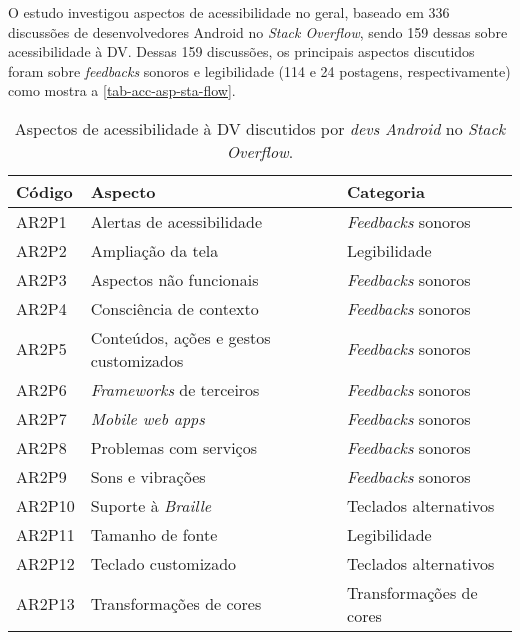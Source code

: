 O estudo investigou aspectos de acessibilidade no geral, baseado em 336 discussões de desenvolvedores Android no \emph{Stack Overflow}, sendo 159 dessas sobre acessibilidade à DV\@.
Dessas 159 discussões, os principais aspectos discutidos foram sobre \emph{feedbacks} sonoros e legibilidade (114 e 24 postagens, respectivamente) como mostra a \autoref{tab-acc-asp-sta-flow}.

\begin{table}[htb]
  \begin{center}
    \ABNTEXfontereduzida
    \caption{Aspectos de acessibilidade à DV discutidos por \emph{devs Android} no \emph{Stack Overflow}.}
    \label{tab-acc-asp-sta-flow}
    \begin{tabular}{p{1.2cm}|p{7.0cm}|p{3.8cm}}
      \textbf{Código} & \textbf{Aspecto}                       & \textbf{Categoria}       \\
      \hline
      AR2P1           & Alertas de acessibilidade              & \emph{Feedbacks} sonoros \\
      \hline
      AR2P2           & Ampliação da tela                      & Legibilidade             \\
      \hline
      AR2P3           & Aspectos não funcionais                & \emph{Feedbacks} sonoros \\
      \hline
      AR2P4           & Consciência de contexto                & \emph{Feedbacks} sonoros \\
      \hline
      AR2P5           & Conteúdos, ações e gestos customizados & \emph{Feedbacks} sonoros \\
      \hline
      AR2P6           & \emph{Frameworks} de terceiros         & \emph{Feedbacks} sonoros \\
      \hline
      AR2P7           & \emph{Mobile web apps}                 & \emph{Feedbacks} sonoros \\
      \hline
      AR2P8           & Problemas com serviços                 & \emph{Feedbacks} sonoros \\
      \hline
      AR2P9           & Sons e vibrações                       & \emph{Feedbacks} sonoros \\
      \hline
      AR2P10          & Suporte à \emph{Braille}               & Teclados alternativos    \\
      \hline
      AR2P11          & Tamanho de fonte                       & Legibilidade             \\
      \hline
      AR2P12          & Teclado customizado                    & Teclados alternativos    \\
      \hline
      AR2P13          & Transformações de cores                & Transformações de cores  \\
    \end{tabular}
  \end{center}
\end{table}

